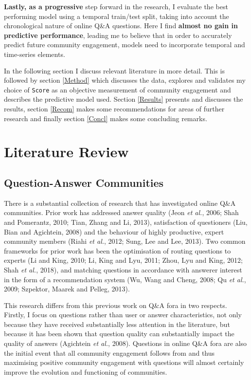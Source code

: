 \documentclass[11pt,preprint, authoryear]{article}
\numberwithin{equation}{section}
\begin{document}
\textbf{Lastly, as a progressive} step forward in the research, I
evaluate the best performing model using a temporal train/test split,
taking into account the chronological nature of online Q\&A questions.
Here I find \textbf{almost no gain in predictive performance}, leading
me to believe that in order to accurately predict future community
engagement, models need to incorporate temporal and time-series
elements.

In the following section I discuss relevant literature in more detail.
This is followed by section \ref{Method} which discusses the data,
explores and validates my choice of \texttt{Score} as an objective
measurement of community engagement and describes the predictive model
used. Section \ref{Results} presents and discusses the results, section
\ref{Recom} makes some recommendations for areas of further research and
finally section \ref{Concl} makes some concluding remarks.

\newpage

\section{\texorpdfstring{Literature Review
\label{Lit}}{Literature Review }}\label{literature-review}

\subsection{Question-Answer
Communities}\label{question-answer-communities}

There is a substantial collection of research that has investigated
online Q\&A communities. Prior work has addressed answer quality (Jeon
\emph{et al.}, 2006; Shah and Pomerantz, 2010; Tian, Zhang and Li,
2013), satisfaction of questioners (Liu, Bian and Agichtein, 2008) and
the behaviour of highly productive, expert community members (Riahi
\emph{et al.}, 2012; Sung, Lee and Lee, 2013). Two common frameworks for
prior work has been the optimisation of routing questions to experts (Li
and King, 2010; Li, King and Lyu, 2011; Zhou, Lyu and King, 2012; Shah
\emph{et al.}, 2018), and matching questions in accordance with answerer
interest in the form of a recommendation system (Wu, Wang and Cheng,
2008; Qu \emph{et al.}, 2009; Szpektor, Maarek and Pelleg, 2013).

This research differs from this previous work on Q\&A fora in two
respects. Firstly, I focus on questions rather than user or answer
characteristics, not only because they have received substantially less
attention in the literature, but because it has been shown that question
quality can substantially impact the quality of answers (Agichtein
\emph{et al.}, 2008). Questions in online Q\&A fora are also the initial
event that all community engagement follows from and thus maximising
positive community engagement with questions will almost certainly
improve the evolution and functioning of communities.
\end{document}
